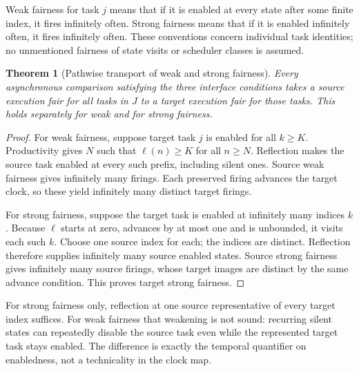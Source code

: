 \documentclass[11pt]{article}
\newtheorem{theorem}{Theorem}\newtheorem{proposition}{Proposition}
\begin{document}
Weak fairness for task $j$ means that if it is enabled at every state after some finite index, it fires infinitely often. Strong fairness means that if it is enabled infinitely often, it fires infinitely often. These conventions concern individual task identities; no unmentioned fairness of state visits or scheduler classes is assumed.

\begin{theorem}[Pathwise transport of weak and strong fairness]\label{fair-fair}
Every asynchronous comparison satisfying the three interface conditions takes a source execution fair for all tasks in $J$ to a target execution fair for those tasks. This holds separately for weak and for strong fairness.
\end{theorem}
\begin{proof}
For weak fairness, suppose target task $j$ is enabled for all $k\ge K$. Productivity gives $N$ such that $\ell(n)\ge K$ for all $n\ge N$. Reflection makes the source task enabled at every such prefix, including silent ones. Source weak fairness gives infinitely many firings. Each preserved firing advances the target clock, so these yield infinitely many distinct target firings.

For strong fairness, suppose the target task is enabled at infinitely many indices $k$. Because $\ell$ starts at zero, advances by at most one and is unbounded, it visits each such $k$. Choose one source index for each; the indices are distinct. Reflection therefore supplies infinitely many source enabled states. Source strong fairness gives infinitely many source firings, whose target images are distinct by the same advance condition. This proves target strong fairness.
\end{proof}

For strong fairness only, reflection at one source representative of every target index suffices. For weak fairness that weakening is not sound: recurring silent states can repeatedly disable the source task even while the represented target task stays enabled. The difference is exactly the temporal quantifier on enabledness, not a technicality in the clock map.
\end{document}
